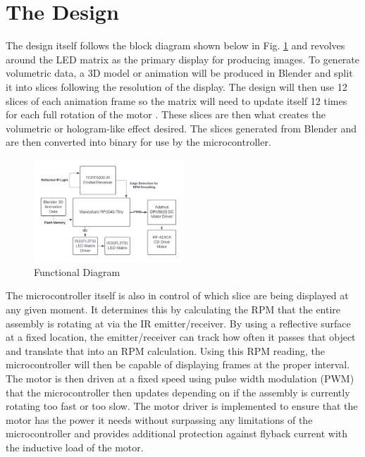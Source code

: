 \documentclass[11pt,journal]{IEEEtran}
\begin{document}
\section{The Design}
The design itself follows the block diagram shown below in Fig. \ref{fig: func diagram} and revolves around the LED matrix as the primary display for producing images. To generate volumetric data, a 3D model or animation will be produced in Blender and split it into slices following the resolution of the display. The design will then use 12 slices of each animation frame so the matrix will need to update itself 12 times for each full rotation of the motor \cite{Sun2014AnID}. These slices are then what creates the volumetric or hologram-like effect desired. The slices generated from Blender and are then converted into binary for use by the microcontroller. 

\begin{figure}[h]
    \centering
    \includegraphics[width=0.5\textwidth]{Block Diagram.png}
   
    \caption{Functional Diagram}
    \label{fig: func diagram}
\end{figure}

The microcontroller itself is also in control of which slice are being displayed at any given moment. It determines this by calculating the RPM that the entire assembly is rotating at via the IR emitter/receiver. By using a reflective surface at a fixed location, the emitter/receiver can track how often it passes that object and translate that into an RPM calculation. Using this RPM reading, the microcontroller will then be capable of displaying frames at the proper interval. The motor is then driven at a fixed speed using pulse width modulation (PWM) that the microcontroller then updates depending on if the assembly is currently rotating too fast or too slow. The motor driver is implemented to ensure that the motor has the power it needs without surpassing any limitations of the microcontroller and provides additional protection against flyback current with the inductive load of the motor.
\end{document}
